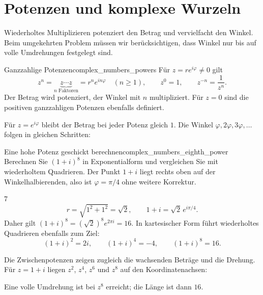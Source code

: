 \section{Potenzen und komplexe Wurzeln}
\label{sec:complex_numbers_powers_and_roots}
Wiederholtes Multiplizieren potenziert den Betrag und vervielfacht den
Winkel. Beim umgekehrten Problem müssen wir berücksichtigen, dass Winkel
nur bis auf volle Umdrehungen festgelegt sind.

\begin{KeyPointBox}{Ganzzahlige Potenzen}{complex_numbers_powers}
  Für $z=re^{i\varphi}\ne0$ gilt
  \[
    z^n=\underbrace{z\cdots z}_{n\text{ Faktoren}}
       =r^ne^{in\varphi}\quad(n\ge1),\qquad
    z^0=1,\qquad z^{-n}=\frac1{z^n}.
  \]
  Der Betrag wird potenziert, der Winkel mit $n$ multipliziert.
  Für $z=0$ sind die positiven ganzzahligen Potenzen ebenfalls definiert.
\end{KeyPointBox}
Für $z=e^{i\varphi}$ bleibt der Betrag bei jeder Potenz gleich $1$.
Die Winkel $\varphi,2\varphi,3\varphi,\ldots$ folgen in gleichen Schritten:
\begin{center}
\end{center}
\begin{ExampleBox}{Eine hohe Potenz geschickt berechnen}{complex_numbers_eighth_power}
  Berechnen Sie $(1+i)^8$ in Exponentialform und vergleichen Sie mit
  wiederholtem Quadrieren. Der Punkt $1+i$ liegt rechts oben auf der
  Winkelhalbierenden, also ist $\varphi=\pi/4$ ohne weitere Korrektur.
  \begin{ClozeArea}{7}
    \[
      r=\sqrt{1^2+1^2}=\sqrt2,\qquad 1+i=\sqrt2\,e^{i\pi/4}.
    \]
    Daher gilt $(1+i)^8=(\sqrt2)^8e^{2\pi i}=16$.
    In kartesischer Form führt wiederholtes Quadrieren ebenfalls zum Ziel:
    \[
      (1+i)^2=2i,\qquad (1+i)^4=-4,\qquad (1+i)^8=16.
    \]
  \end{ClozeArea}
\end{ExampleBox}

\clearpage
Die Zwischenpotenzen zeigen zugleich die wachsenden Beträge und die Drehung.
Für $z=1+i$ liegen $z^2$, $z^4$, $z^6$ und $z^8$ auf den Koordinatenachsen:
\begin{center}
\end{center}
Eine volle Umdrehung ist bei $z^8$ erreicht; die Länge ist dann $16$.

